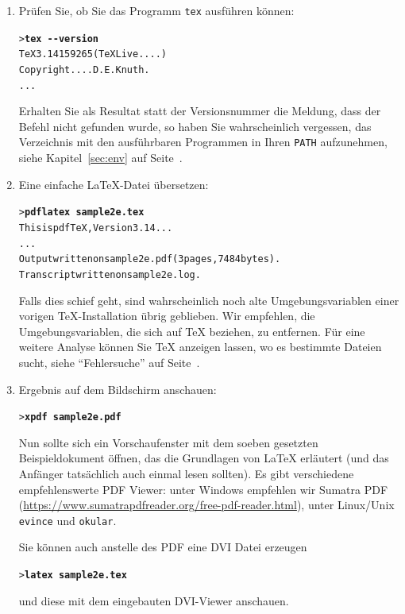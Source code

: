 \documentclass[12pt,ngerman,a4paper,fullparskip]{report}
\newcommand{\cmdname}[1]{\texttt{#1}}
\newcommand{\envname}[1]{\texttt{#1}}
\newcommand{\Ucom}[1]{\textbf{\texttt{#1}}}
\begin{document}
\begin{enumerate}

\item Prüfen Sie, ob Sie das Programm \cmdname{tex} ausführen können:

\begin{alltt}
> \Ucom{tex -{}-version}
TeX 3.14159265 (TeX Live ....)
Copyright .... D.E. Knuth.
...
\end{alltt}

Erhalten Sie als Resultat statt der Versionsnummer die Meldung, dass der Befehl nicht gefunden wurde,
so haben Sie wahrscheinlich vergessen, das Verzeichnis mit den ausführbaren Programmen
in Ihren \envname{PATH} aufzunehmen, siehe Kapitel~\ref{sec:env} auf Seite~\pageref{sec:env}.

\item Eine einfache \LaTeX{}-Datei übersetzen:
\begin{alltt}
> \Ucom{pdflatex sample2e.tex}
This is pdfTeX, Version 3.14...
...
Output written on sample2e.pdf (3 pages, 7484 bytes).
Transcript written on sample2e.log.
\end{alltt}

Falls dies schief geht, sind wahrscheinlich noch alte Umgebungsvariablen einer vorigen \TeX-Installation
übrig geblieben. Wir empfehlen, die Umgebungsvariablen, die sich auf \TeX{} beziehen, zu entfernen.
Für eine weitere Analyse können Sie \TeX{} anzeigen lassen, wo es bestimmte Dateien sucht,
siehe \enquote{Fehlersuche} auf Seite~\pageref{sec:debugging}.

\item Ergebnis auf dem Bildschirm anschauen:
\begin{alltt}
> \Ucom{xpdf sample2e.pdf}    
\end{alltt}

Nun sollte sich ein Vorschaufenster mit dem soeben gesetzten Beispieldokument öffnen, das die Grundlagen von \LaTeX{} erläutert (und das Anfänger tatsächlich auch einmal lesen sollten). Es gibt verschiedene empfehlenswerte PDF Viewer: unter Windows empfehlen wir Sumatra PDF (\url{https://www.sumatrapdfreader.org/free-pdf-reader.html}), unter Linux/Unix \cmdname{evince} und \cmdname{okular}.

Sie können auch anstelle des PDF eine DVI Datei erzeugen 

\begin{alltt}
> \Ucom{latex sample2e.tex}    
\end{alltt}

und diese mit dem eingebauten DVI-Viewer anschauen.


\end{enumerate}
\end{document}
